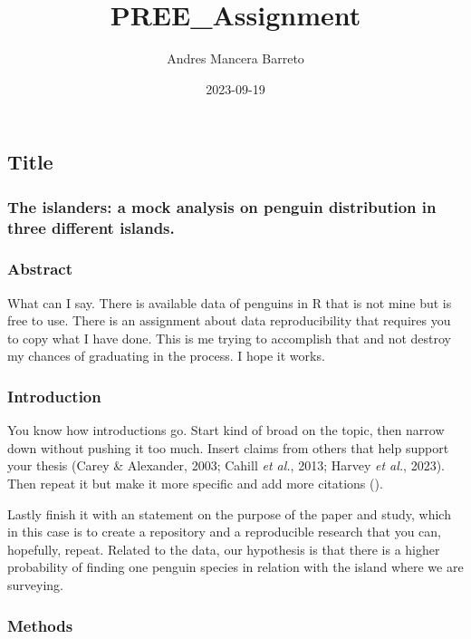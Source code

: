 \documentclass[
]{article}
\title{PREE\_Assignment}
\author{Andres Mancera Barreto}
\date{2023-09-19}
\begin{document}
\maketitle

\hypertarget{title}{%
\subsection{Title}\label{title}}

\hypertarget{the-islanders-a-mock-analysis-on-penguin-distribution-in-three-different-islands.}{%
\subsubsection{The islanders: a mock analysis on penguin distribution in
three different
islands.}\label{the-islanders-a-mock-analysis-on-penguin-distribution-in-three-different-islands.}}

\hypertarget{abstract}{%
\subsubsection{Abstract}\label{abstract}}

What can I say. There is available data of penguins in R that is not
mine but is free to use. There is an assignment about data
reproducibility that requires you to copy what I have done. This is me
trying to accomplish that and not destroy my chances of graduating in
the process. I hope it works.

\hypertarget{introduction}{%
\subsubsection{Introduction}\label{introduction}}

You know how introductions go. Start kind of broad on the topic, then
narrow down without pushing it too much. Insert claims from others that
help support your thesis (Carey \& Alexander, 2003; Cahill \emph{et
al.}, 2013; Harvey \emph{et al.}, 2023). Then repeat it but make it more
specific and add more citations ().

Lastly finish it with an statement on the purpose of the paper and
study, which in this case is to create a repository and a reproducible
research that you can, hopefully, repeat. Related to the data, our
hypothesis is that there is a higher probability of finding one penguin
species in relation with the island where we are surveying.

\hypertarget{methods}{%
\subsubsection{Methods}\label{methods}}
\end{document}
